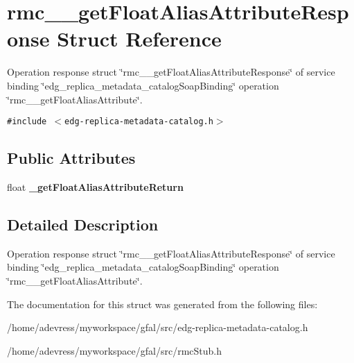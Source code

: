 \section{rmc\_\-\_\-get\-Float\-Alias\-Attribute\-Response Struct Reference}
\label{structrmc____getFloatAliasAttributeResponse}
Operation response struct \char`\"{}rmc\_\-\_\-get\-Float\-Alias\-Attribute\-Response\char`\"{} of service binding \char`\"{}edg\_\-replica\_\-metadata\_\-catalog\-Soap\-Binding\char`\"{} operation \char`\"{}rmc\_\-\_\-get\-Float\-Alias\-Attribute\char`\"{}.  


{\tt \#include $<$edg-replica-metadata-catalog.h$>$}

\subsection*{Public Attributes}
\begin{CompactItemize}
\item 
float \textbf{\_\-get\-Float\-Alias\-Attribute\-Return}\label{structrmc____getFloatAliasAttributeResponse_d4b9fcd857ab623141d490ef6dda1d2d}

\end{CompactItemize}


\subsection{Detailed Description}
Operation response struct \char`\"{}rmc\_\-\_\-get\-Float\-Alias\-Attribute\-Response\char`\"{} of service binding \char`\"{}edg\_\-replica\_\-metadata\_\-catalog\-Soap\-Binding\char`\"{} operation \char`\"{}rmc\_\-\_\-get\-Float\-Alias\-Attribute\char`\"{}. 



The documentation for this struct was generated from the following files:\begin{CompactItemize}
\item 
/home/adevress/myworkspace/gfal/src/edg-replica-metadata-catalog.h\item 
/home/adevress/myworkspace/gfal/src/rmc\-Stub.h\end{CompactItemize}
